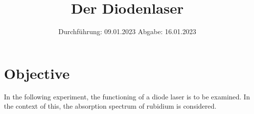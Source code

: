 

\subject{V60}
\title{Der Diodenlaser}
\date{
    Durchführung: 09.01.2023
     \hspace{3em}
    Abgabe: 16.01.2023
}


\maketitle
\thispagestyle{empty}
\tableofcontents
\newpage

\section{Objective}

    In the following experiment,
    the functioning of a diode laser is to be examined.
    In the context of this,
    the absorption spectrum of rubidium is considered.


\clearpage


\clearpage


\clearpage


\clearpage

\printbibliography


